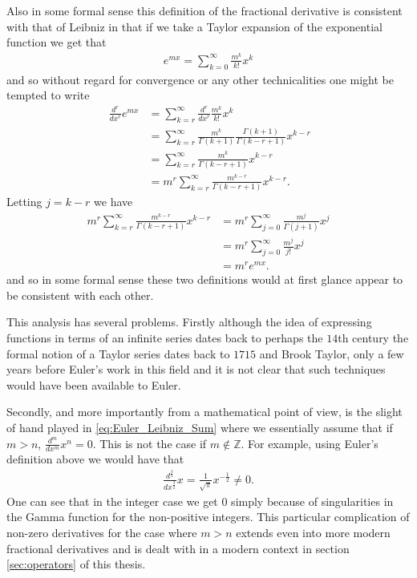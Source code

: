 Also in some formal sense this definition of the fractional derivative is consistent with that of Leibniz in that if we take a Taylor expansion of the exponential function we get that
\begin{align}
    e^{mx} = \sum_{k=0}^\infty \frac{m^k}{k!} x^k
\end{align}
and so without regard for convergence or any other technicalities one might be tempted to write
\begin{align}
    \label{eq:Euler_Leibniz_Sum}\
    \frac{d^r}{dx^r} e^{mx} &= \sum_{k = r}^\infty \frac{d^r}{dx^r} \frac{m^k}{k!} x^k \\
                            &= \sum_{k = r}^\infty \frac{m^k}{\Gamma(k+1)} \frac{\Gamma(k+1)}{\Gamma(k - r + 1)} x^{k-r} \\             
                            &= \sum_{k = r}^\infty \frac{m^k}{\Gamma(k - r + 1)}x^{k-r} \\
                            &= m^r \sum_{k = r}^\infty \frac{m^{k-r}}{\Gamma(k - r + 1)}x^{k-r}.
\end{align}
Letting $ j = k - r $ we have
\begin{align*}
    m^r \sum_{k = r}^\infty \frac{m^{k-r}}{\Gamma(k - r + 1)}x^{k-r}
        &= m^r \sum_{j = 0}^\infty \frac{m^{j}}{\Gamma(j + 1)}x^{j} \\
        &= m^r \sum_{j = 0}^\infty \frac{m^{j}}{j!}x^{j} \\
        &= m^r e^{mx}.
\end{align*}
and so in some formal sense these two definitions would at first glance appear to be consistent with each other.

This analysis has several problems. Firstly although the idea of expressing functions in terms of an infinite series dates back to perhaps the $ 14$th century the formal notion of a Taylor series dates back to $1715$ and Brook Taylor, only a few years before Euler's work in this field and it is not clear that such techniques would have been available to Euler. 

Secondly, and more importantly from a mathematical point of view, is the slight of hand played in \eqref{eq:Euler_Leibniz_Sum} where we essentially assume that if $ m > n $, $ \frac{d^m}{dx^m} x^n = 0 $. This is not the case if $ m \not\in \mathbb{Z} $. For example, using Euler's definition above we would have that
\begin{align}
    \frac{d^\frac{3}{2}}{dx^\frac{3}{2}} x = \frac{1}{\sqrt{\pi}} x^{-\frac{1}{2}} \neq 0.
\end{align}
One can see that in the integer case we get $ 0 $ simply because of singularities in the Gamma function for the non-positive integers. This particular complication of non-zero derivatives for the case where $ m > n $ extends even into more modern fractional derivatives and is dealt with in a modern context in section \ref{sec:operators} of this thesis.

